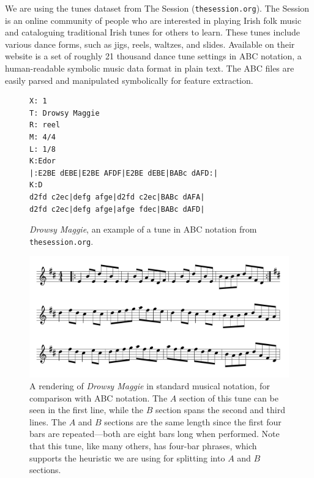 \documentclass{article} %
\begin{document}
We are using the tunes dataset from The Session (\texttt{thesession.org}). The
Session is an online community of people who are interested in playing Irish
folk music and cataloguing traditional Irish tunes for others to learn. These
tunes include various dance forms, such as jigs, reels, waltzes, and slides.
Available on their website is a set of roughly 21 thousand dance tune settings
in ABC notation, a human-readable symbolic music data format in plain text. The
ABC files are easily parsed and manipulated symbolically for feature extraction.
\FloatBarrier
\begin{figure}[t]
  \begin{center}
  \begin{BVerbatim}
X: 1
T: Drowsy Maggie
R: reel
M: 4/4
L: 1/8
K:Edor
|:E2BE dEBE|E2BE AFDF|E2BE dEBE|BABc dAFD:|
K:D
d2fd c2ec|defg afge|d2fd c2ec|BABc dAFA|
d2fd c2ec|defg afge|afge fdec|BABc dAFD|
  \end{BVerbatim}
  \end{center}
  \caption{\textit{Drowsy Maggie}, an example of a tune in ABC notation from
  \texttt{thesession.org}.}
\end{figure}

\begin{figure}[t]
  \begin{center}
    \includegraphics[width=5in]{drowsymaggie.png}
  \end{center}
  \caption{A rendering of \textit{Drowsy Maggie} in standard musical notation, for
  comparison with ABC notation. The $A$ section of this tune can be seen in the
first line, while the $B$ section spans the second and third lines. The $A$ and
$B$ sections are the same length since the first four bars are repeated---both
are eight bars long when performed. Note that this tune, like many others, has
four-bar phrases, which supports the heuristic we are using for splitting into
$A$ and $B$ sections.}
  \label{fig:drowsymusic}
\end{figure}
\end{document}
